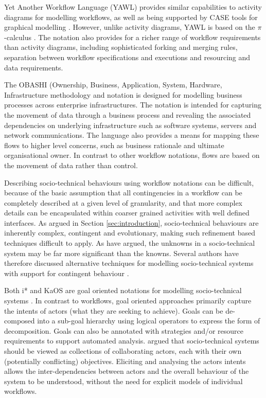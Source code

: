 \documentclass{sig-alternate}
\newcommand{\picalc}{\(\pi\)-calculus }
\begin{document}
Yet Another Workflow Language (YAWL) provides similar capabilities to activity
diagrams for modelling workflows, as well as being supported by CASE tools for
graphical modelling \citep{hofstede2010yawl}.  However, unlike activity diagrams,
YAWL is based on the \picalc\citep{Aalst2004}.  The notation also provides for a
richer range of workflow requirements than activity diagrams, including
sophisticated forking and merging rules, separation between workflow
specifications and executions and resourcing and data requirements.

The OBASHI (Ownership, Business, Application, System, Hardware, Infrastructure
methodology and notation \citep{obashimethodology} is designed for modelling
business processes across enterprise infrastructures.  The notation is intended
for capturing the movement of data through a business process and revealing the
associated dependencies on underlying infrastructure such as software systems,
servers and network communications.  The language also provides a means for
mapping these flows to higher level concerns, such as business rationale and
ultimate organisational owner. In contrast to other workflow notations, flows
are based on the movement of data rather than control.


Describing socio-technical behaviours using workflow notations can be difficult,
because of the basic assumption that all contingencies in a workflow can be
completely described at a given level of granularity, and that more complex
details can be encapsulated within coarser grained activities with well defined
interfaces.  As argued in Section \ref{sec:introduction}, socio-technical
behaviours are inherently complex, contingent and evolutionary, making such
refinement based techniques difficult to apply.  As
\citet{israilidis13ignorance} have argued, the unknowns in a socio-technical
system may be far more significant than the knowns. Several authors have
therefore discussed alternative techniques for modelling socio-technical systems
with support for contingent behaviour
\citep{yu1995,dardenne93goal,Herrmann1999,sommerville09deriving}.

Both i*\citet{yu1995} and KaOS \citet{dardenne93goal} are goal oriented
notations for modelling socio-technical systems \citep{Werneck2009}.  In
contrast to workflows, goal oriented approaches primarily capture the intents of
actors (what they are seeking to achieve).  Goals can be de-composed into a
sub-goal hierarchy using logical operators to express the form of
decomposition. Goals can also be annotated with strategies and/or resource
requirements to support automated analysis.  \citeauthor{yu1995} argued that
socio-technical systems should be viewed as collections of collaborating actors,
each with their own (potentially conflicting) objectives.  Eliciting and
analysing the actors intents allows the inter-dependencies between actors and
the overall behaviour of the system to be understood, without the need for
explicit models of individual workflows.
\end{document}
